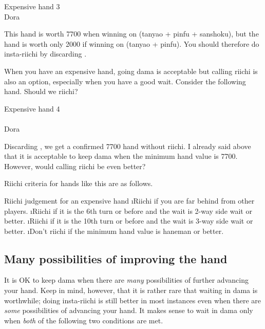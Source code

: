 \bigskip
\begin{itembox}[r]{Expensive hand 3}
\bp
{}~~\bei\\
\hfill\footnotesize{{\jap Dora}~~~~~~~}
\ep
\vspace{-15pt}
\end{itembox}

\noindent This hand is worth 7700 when winning on {\LARGE {}} ({\jap tanyao + pinfu + sanshoku}), but the hand is worth only 2000 if winning on {\LARGE {}} ({\jap tanyao + pinfu}). You should therefore do insta-riichi by discarding {\LARGE{}}. 

\bigskip
When you have an expensive hand, going {\jap dama} is acceptable but calling riichi is also an option, especially when you have a good wait. Consider the following hand. Should we riichi?

\bigskip
\begin{itembox}[r]{Expensive hand 4}
\bp
{}\\ \vspace{-16pt}
\rfs{}~~\\
\hfill\footnotesize{{\jap Dora}~~~~~~~}
\ep
\vspace{-15pt}
\end{itembox}

\noindent Discarding {\LARGE{}}, we get a confirmed 7700 hand without riichi. I already said above that it is acceptable to keep {\jap dama} when the minimum hand value is 7700. However, would calling riichi be even better? 

\bigskip
Riichi criteria for hands like this are as follows.

\bigskip
\begin{itembox}[c]{Riichi judgement for an expensive hand}
\bi
\i Riichi if you are far behind from other players.
\i Riichi if it is the 6th turn or before and the wait is 2-way side wait or better.
\i Riichi if it is the 10th turn or before and the wait is 3-way side wait or better.
\i Don't riichi if the minimum hand value is {\jap haneman} or better.
\ei
\vsps
\end{itembox}

\bigskip
\subsection{Many possibilities of improving the hand} \label{sec:imp}
It is OK to keep {\jap dama} when there are \emph{many} possibilities of further advancing your hand. Keep in mind, however, that it is rather rare that waiting in {\jap dama} is worthwhile; doing insta-riichi is still better in most instances even when there are \emph{some} possibilities of advancing your hand. It makes sense to wait in {\jap dama} only when \emph{both} of the following two conditions are met. 

